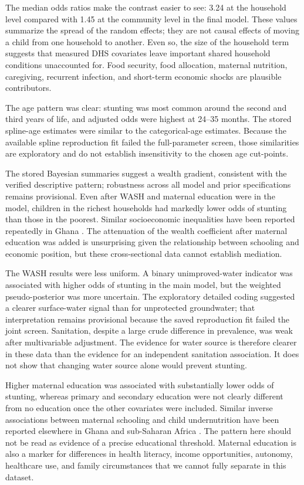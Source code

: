 \documentclass[11pt]{article}
\begin{document}
The median odds ratios make the contrast easier to see: 3.24 at the household level compared with 1.45 at the community level in the final model. These values summarize the spread of the random effects; they are not causal effects of moving a child from one household to another. Even so, the size of the household term suggests that measured DHS covariates leave important shared household conditions unaccounted for. Food security, food allocation, maternal nutrition, caregiving, recurrent infection, and short-term economic shocks are plausible contributors.

The age pattern was clear: stunting was most common around the second and third years of life, and adjusted odds were highest at 24--35 months. The stored spline-age estimates were similar to the categorical-age estimates. Because the available spline reproduction fit failed the full-parameter screen, those similarities are exploratory and do not establish insensitivity to the chosen age cut-points.

The stored Bayesian summaries suggest a wealth gradient, consistent with the verified descriptive pattern; robustness across all model and prior specifications remains provisional. Even after WASH and maternal education were in the model, children in the richest households had markedly lower odds of stunting than those in the poorest. Similar socioeconomic inequalities have been reported repeatedly in Ghana \citep{SeworJayalakshmi2024,OsborneEtAl2025}. The attenuation of the wealth coefficient after maternal education was added is unsurprising given the relationship between schooling and economic position, but these cross-sectional data cannot establish mediation.

The WASH results were less uniform. A binary unimproved-water indicator was associated with higher odds of stunting in the main model, but the weighted pseudo-posterior was more uncertain. The exploratory detailed coding suggested a clearer surface-water signal than for unprotected groundwater; that interpretation remains provisional because the saved reproduction fit failed the joint screen. Sanitation, despite a large crude difference in prevalence, was weak after multivariable adjustment. The evidence for water source is therefore clearer in these data than the evidence for an independent sanitation association. It does not show that changing water source alone would prevent stunting.

Higher maternal education was associated with substantially lower odds of stunting, whereas primary and secondary education were not clearly different from no education once the other covariates were included. Similar inverse associations between maternal schooling and child undernutrition have been reported elsewhere in Ghana and sub-Saharan Africa \citep{AhetoEtAl2015,TakeleEtAl2022,AgyenEtAl2024}. The pattern here should not be read as evidence of a precise educational threshold. Maternal education is also a marker for differences in health literacy, income opportunities, autonomy, healthcare use, and family circumstances that we cannot fully separate in this dataset.
\end{document}
